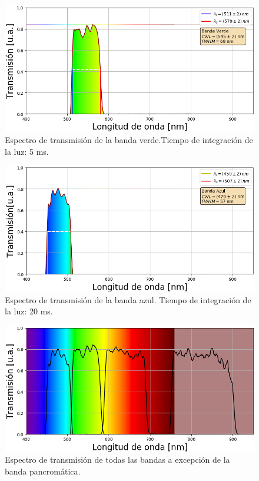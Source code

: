 \begin{figure}[H]
	\centering
	\includegraphics[scale=0.8]{Figs/microespectrometro/espectro_verdet.png}
	\caption{Espectro de transmisión de la banda verde.Tiempo de integración de la luz: 5 ms.}
	\label{fig:bverde}
\end{figure}
\begin{figure}[H]
	\centering
	\includegraphics[scale=0.8]{Figs/microespectrometro/espectro_azult.png}
	\caption{Espectro de transmisión de la banda azul. Tiempo de integración de la luz: 20 ms.}
	\label{fig:bazul}
\end{figure}

 \begin{figure}[H]
	\centering
	\includegraphics[scale=0.8]{Figs/microespectrometro/4bandas_conimshowT.png}
	\caption{Espectro de transmisión de todas las bandas a excepción de la banda pancromática.}
	\label{fig:batod}
\end{figure}

